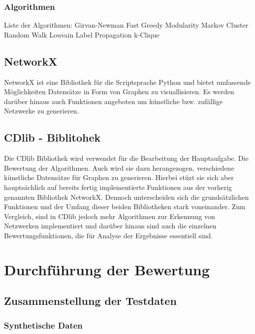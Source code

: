 \subsection{Algorithmen}\label{Algorithmen}

Liste der Algorithmen:
Girvan-Newman
Fast Greedy Modularity
Markov Cluster
Random Walk
Louvain
Label Propagation
k-Clique

\section{NetworkX}\label{NetworkX}
NetworkX ist eine Bibliothek für die Scriptsprache Python und bietet umfassende Möglichkeiten Datensätze in Form von Graphen zu visuallisieren. Es werden darüber hinaus auch Funktionen angeboten um künstliche bzw. zufällige Netzwerke zu generieren.

\section{CDlib - Biblitohek}\label{CDlib - Bibliothek}
Die CDlib Bibliothek wird verwendet für die Bearbeitung der Hauptaufgabe. Die Bewertung der Algorithmen. Auch wird sie dazu herangezogen, verschiedene künstliche Datensätze für Graphen zu generieren. Hierbei stüzt sie sich aber hauptsächlich auf bereits fertig implementierte Funktionen aus der vorherig genannten Bibliothek NetworkX. Dennoch unterscheiden sich die grundsätzlichen Funktionen und der Umfang dieser beiden Bibliotheken stark voneinander. Zum Vergleich, sind in CDlib jedoch mehr Algorithmen zur Erkennung von Netzwerken implementiert und darüber hinaus sind auch die einzelnen Bewertungsfunktionen, die für Analyse der Ergebnisse essentiell sind.

\chapter{Durchführung der Bewertung}

\section{Zusammenstellung der Testdaten}\label{Zusammenstellung der Testdaten}

\subsection{Synthetische Daten}\label{Synthetische Daten}

